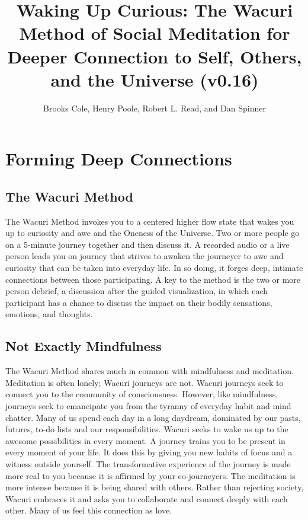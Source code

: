 \documentclass[12pt]{book}
\begin{document}
\title{Waking Up Curious: The Wacuri Method of Social Meditation for Deeper Connection to Self, Others, and the Universe (v0.16)}

\author{Brooks Cole, Henry Poole, Robert L. Read, and Dan Spinner}
\date{ }

\maketitle
\tableofcontents


\chapter{Forming Deep Connections}

\section{The Wacuri Method}

The Wacuri Method invokes  you  to a centered higher flow state that wakes you up to curiosity and awe and the Oneness of the Universe. Two or more people go on a 5-minute journey together and then discuss it. A recorded audio or a live person leads you on  journey that strives to awaken the journeyer to awe and curiosity that can be taken into everyday life. In so doing, it forges deep, intimate connections between those participating. A key to the method is the two or more person debrief, a discussion after the guided visualization, in which each participant has a chance to discuss the impact on their bodily sensations, emotions, and thoughts.


\section{Not Exactly Mindfulness}

The Wacuri Method shares much in common with mindfulness and meditation. Meditation is often lonely; Wacuri journeys are not. Wacuri journeys seek to connect you to the community of consciousness. However, like mindfulness, journeys seek to emancipate you from the tyranny of everyday habit and mind chatter. Many of us spend each day in a long daydream, dominated by our pasts, futures, to-do lists and our responsibilities. Wacuri seeks to wake us up to the awesome possibilities in every moment. A journey trains you to be present in every moment of your life. It does this by giving you new habits of focus and a witness outside yourself. The transformative experience of the journey is made more real to you because it is affirmed by your co-journeyers. The meditation is more intense because it is being shared with others. Rather than rejecting society, Wacuri embraces it and asks you to collaborate and connect deeply with each other.
Many of us feel this connection as love.
\end{document}

